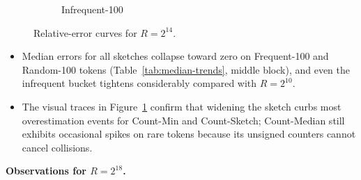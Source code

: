 \documentclass[11pt]{article}
\begin{document}
\begin{figure}[H]
\begin{subfigure}[t]{0.32\linewidth}
    \caption{Infrequent-100}
  \end{subfigure}
  \caption{Relative-error curves for $R=2^{14}$.}
  \label{fig:error-r16384}
\end{figure}



\begin{itemize}
  \item Median errors for all sketches collapse toward zero on Frequent-100 and Random-100 tokens (Table~\ref{tab:median-trends}, middle block), and even the infrequent bucket tightens considerably compared with $R=2^{10}$.
  \item The visual traces in Figure~\ref{fig:error-r16384} confirm that widening the sketch curbs most overestimation events for Count-Min and Count-Sketch; Count-Median still exhibits occasional spikes on rare tokens because its unsigned counters cannot cancel collisions.
\end{itemize}

\noindent\textbf{Observations for $R=2^{18}$.}
\end{document}
